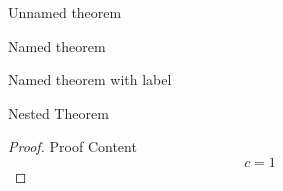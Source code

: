 \begin{theorem}
    Unnamed theorem
\end{theorem}

\begin{theorem}
    Named theorem
\end{theorem}

\begin{theorem}
    Named theorem with label
    \label{thm:label}
\end{theorem}

\begin{theorem}[Name 1]
    Nested Theorem
    \begin{proof}
        Proof Content
        \[
            c = 1
        \]
    \end{proof}
\end{theorem}

